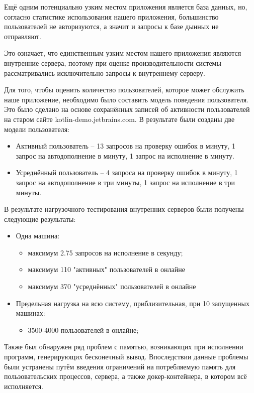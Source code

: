 	Ещё одним потенциально узким местом приложения является база данных, но, согласно статистике использования нашего приложения, большинство пользователей не авторизуются, а значит и запросы к базе дынных не отправляют.
	
	Это означает, что единственным узким местом нашего приложения являются внутренние сервера, поэтому при оценке производительности системы рассматривались исключительно запросы к внутреннему серверу.

	Для того, чтобы оценить количество пользователей, которое может обслужить наше приложение, необходимо было составить модель поведения пользователя. Это было сделано на основе сохранённых записей об активности пользователей на старом сайте kotlin-demo.jetbrains.com. В результате были созданы две модели пользователя:
\begin{itemize}
	\item Активный пользователь -- 13 запросов на проверку ошибок в минуту, 1 запрос на автодополнение в минуту, 1 запрос на исполнение в минуту.
	\item Усреднённый пользователь -- 4 запроса на проверку ошибок в минуту, 1 запрос на автодополнение в три минуты, 1 запрос на исполнение в три минуты.
\end{itemize}
	
	В результате нагрузочного тестирования внутренних серверов были получены следующие результаты:
	\begin{itemize}
		\item Одна машина:
		\begin{itemize}
			\item максимум 2.75 запросов на исполнение в секунду;
			\item максимум 110 "активных" пользователей в онлайне
			\item максимум 370 "усреднённых" пользователей в онлайне 
		\end{itemize}
		
		\item Предельная нагрузка на всю систему, приблизительная, при 10 запущенных машинах:
		\begin{itemize}
			\item 3500-4000 пользователей в онлайне;
		\end{itemize} 
	\end{itemize}
	Также был обнаружен ряд проблем с памятью, возникающих при исполнении программ, генерирующих бесконечный вывод. Впоследствии данные проблемы были устранены путём введения ограничений на потребляемую память для пользовательских процессов, сервера, а также докер-контейнера, в котором всё исполняется.
	

